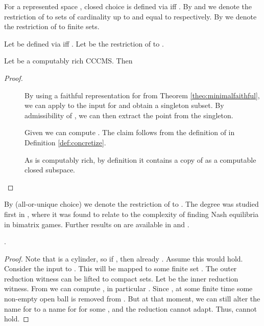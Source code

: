 \documentclass{eptcs-modified}
\begin{document}
\begin{definition}
For a represented space , closed choice  is defined via  iff . By  and  we denote the restriction of  to sets of cardinality up to  and equal to  respectively. By  we denote the restriction of  to finite sets.
\end{definition}

\begin{definition}
\label{def:concretize}
Let  be defined via  iff . Let  be the restriction of  to .
\end{definition}

\begin{corollary}
Let  be a computably rich CCCMS. Then

\begin{proof}
\begin{description}
\item[] By using a faithful representation for  from Theorem \ref{theo:minimalfaithful}, we can apply  to the input for  and obtain a singleton subset. By admissibility of , we can then extract the point from the singleton.
\item[] Given  we can compute . The claim follows from the definition of  in Definition \ref{def:concretize}.
\item[] As  is computably rich, by definition it contains a copy of  as a computable closed subspace.
\end{description}
\end{proof}
\end{corollary}

By  (all-or-unique choice) we denote the restriction of  to . The degree  was studied first in \cite{paulyincomputabilitynashequilibria}, where it was found to relate to the complexity of finding Nash equilibria in bimatrix games. Further results on  are available in \cite[Section 16 \& 17]{hoelzl} and \cite{pauly-kihara2-mfcs}.

\begin{proposition}
.
\begin{proof}
Note that  is a cylinder, so if , then already . Assume this would hold. Consider the input  to . This will be mapped to some finite set . The outer reduction witness  can be lifted to compact sets. Let  be the inner reduction witness. From  we can compute , in particular . Since , at some finite time some non-empty open ball  is removed from . But at that moment, we can still alter the name for  to a name for  for some , and the reduction cannot adapt. Thus,  cannot hold.
\end{proof}
\end{proposition}
\end{document}
